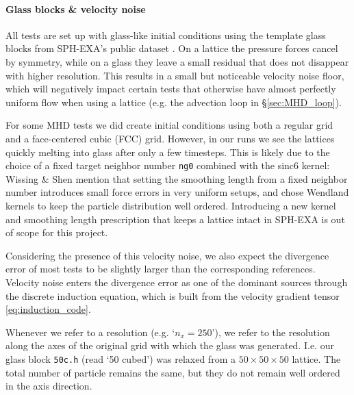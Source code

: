 
\paragraph{Glass blocks \& velocity noise}
All tests are set up with glass-like initial conditions using the template glass blocks from SPH-EXA's public dataset \cite{Keller2023}. On a lattice the pressure forces cancel by symmetry, while on a glass they leave a small residual that does not disappear with higher resolution. This results in a small but noticeable velocity noise floor, which will negatively impact certain tests that otherwise have almost perfectly uniform flow when using a lattice (e.g. the advection loop in §\ref{sec:MHD_loop}).

For some MHD tests we did create initial conditions using both a regular grid and a face-centered cubic (FCC) grid. However, in our runs we see the lattices quickly melting into glass after only a few timesteps. This is likely due to the choice of a fixed target neighbor number \texttt{ng0} combined with the sinc6 kernel: Wissing \& Shen \cite{WissingShen2020} mention that setting the smoothing length from a fixed neighbor number introduces small force errors in very uniform setups, and chose Wendland kernels to keep the particle distribution well ordered. Introducing a new kernel and smoothing length prescription that keeps a lattice intact in SPH-EXA is out of scope for this project.

Considering the presence of this velocity noise, we also expect the divergence error of most tests to be slightly larger than the corresponding references. Velocity noise enters the divergence error as one of the dominant sources through the discrete induction equation, which is built from the velocity gradient tensor \eqref{eq:induction_code}. 

Whenever we refer to a resolution (e.g. `$n_x = 250$'), we refer to the resolution along the axes of the original grid with which the glass was generated. I.e. our glass block \texttt{50c.h} (read `50 cubed') was relaxed from a $50 \times 50 \times 50$ lattice. The total number of particle remains the same, but they do not remain well ordered in the axis direction. 


